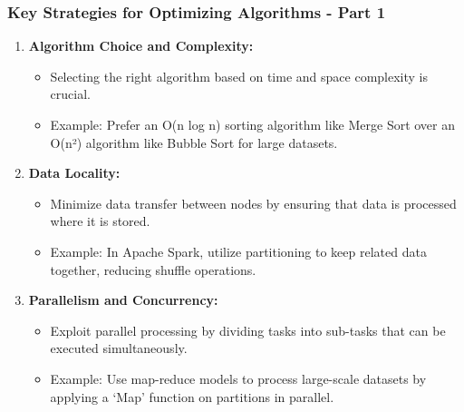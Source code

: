 \documentclass{beamer}
\begin{document}
\begin{frame}[fragile]
    \frametitle{Key Strategies for Optimizing Algorithms - Part 1}
    \begin{enumerate}
        \item \textbf{Algorithm Choice and Complexity:}
        \begin{itemize}
            \item Selecting the right algorithm based on time and space complexity is crucial.
            \item Example: Prefer an O(n log n) sorting algorithm like Merge Sort over an O(n²) algorithm like Bubble Sort for large datasets.
        \end{itemize}

        \item \textbf{Data Locality:}
        \begin{itemize}
            \item Minimize data transfer between nodes by ensuring that data is processed where it is stored.
            \item Example: In Apache Spark, utilize partitioning to keep related data together, reducing shuffle operations.
        \end{itemize}

        \item \textbf{Parallelism and Concurrency:}
        \begin{itemize}
            \item Exploit parallel processing by dividing tasks into sub-tasks that can be executed simultaneously.
            \item Example: Use map-reduce models to process large-scale datasets by applying a ‘Map’ function on partitions in parallel.
        \end{itemize}
    \end{enumerate}
\end{frame}
\end{document}
